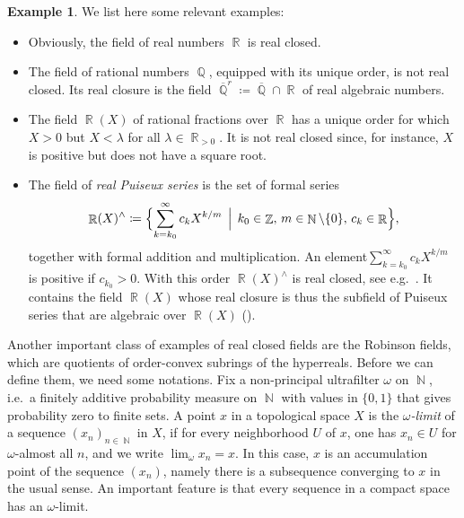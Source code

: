 \documentclass{amsart}
\theoremstyle{plain}
\theoremstyle{definition}
\newtheorem{example}[proposition]{Example}
\DeclareMathOperator{\Nb}{{\mathbb{N}}}
\DeclareMathOperator{\Rb}{{\mathbb{R}}}
\DeclareMathOperator{\Zb}{\mathbb{Z}}
\DeclareMathOperator{\Qb}{\mathbb{Q}}
\newcommand{\1}{\mathbf{1}}
\begin{document}
\begin{example}\label{example:OrderedFields}
    We list here some relevant examples: 
    \begin{itemize}
        \item Obviously, the field of real numbers $\Rb$ is real  closed.
        \item The field of rational numbers $\Qb$, equipped with its unique order, is not real closed. Its real closure is the field $\overline{\Qb}^r \coloneqq \overline{\Qb} \cap \Rb$ of real algebraic numbers.
        \item The field $\Rb(X)$ of rational fractions over $\Rb$ has a unique order for which $X>0$ but $X<\lambda$ for all $\lambda \in \Rb_{>0}$. It is not real closed since, for instance, $X$ is positive but does not have a square root.
        \item The field of \emph{real Puiseux series} is the set of formal series \[\Rb(X)^\wedge \coloneqq \Bigl\{  \sum_{k=k_0}^{\infty} c_k X^{k/m} \, \Bigm| \, k_0 \in \Zb, \, m \in \Nb\setminus\{0\} , \, c_k \in \Rb \Bigr\},\] together with formal addition and multiplication. An element\break $\sum_{k=k_0}^{\infty} c_k X^{k/m}$ is positive if $c_{k_0} > 0$. With this order $\Rb(X)^\wedge$ is real closed, see e.g.\ \cite[Theorem 2.91]{BasuPollackRoy_AlgorithmsRealAlgebraicGeometry}. It contains the field $\Rb(X)$ whose real closure is thus the subfield of Puiseux series that are algebraic over $\Rb(X)$ (\cite[Example 1.3.6~(b)]{BochnakCosteRoy_RealAlgebraicGeometry}).
    \end{itemize}
\end{example}

Another important class of examples of real closed fields are the Robinson fields, which are quotients of order-convex subrings of the hyperreals. Before we can define them, we need some notations. Fix a non-principal ultrafilter $\omega$ on $\Nb$, i.e.\ a finitely additive probability measure on $\Nb$ with values in $\{0,1\}$ that gives probability zero to finite sets. A point $x$ in a topological space $X$ is the \emph{$\omega$-limit} of a sequence $(x_n)_{n\in\Nb}$ in $X$, if for every neighborhood $U$ of $x$, one has $x_n\in U$ for $\omega$-almost all $n$, and we write $\lim_\omega x_n=x$. 
In this case, $x$ is an accumulation point of the sequence $(x_n)$, namely there is a subsequence converging to $x$ in the usual sense.
An important feature is that every sequence in a compact space has an $\omega$-limit.
\end{document}
